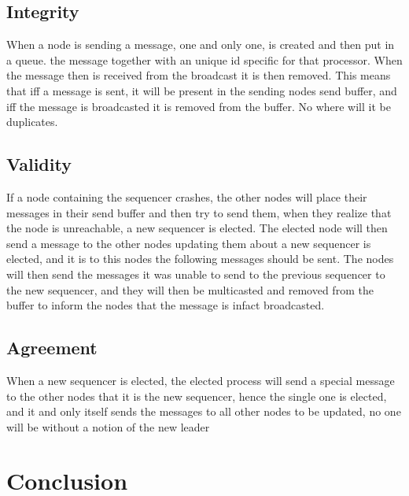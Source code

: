 \documentclass{article}
\begin{document}
  \subsection{Integrity}
    When a node is sending a message, one and only one, is created and then put in a queue.
    the message together with an unique id specific for that processor. When the message then is 
    received from the broadcast it is then removed. This means that iff a message is sent, it
    will be present in the sending nodes send buffer, and iff the message is broadcasted it is
    removed from the buffer. No where will it be duplicates.
  \subsection{Validity}
    If a node containing the sequencer crashes, the other nodes will place their messages in their
    send buffer and then try to send them, when they realize that the node is unreachable, a new 
    sequencer is elected. The elected node will then send a message to the other nodes updating them
    about a new sequencer is elected, and it is to this nodes the following messages should be sent.
    The nodes will then send the messages it was unable to send to the previous sequencer to the
    new sequencer, and they will then be multicasted and removed from the buffer to inform the nodes
    that the message is infact broadcasted.
  \subsection{Agreement}
    When a new sequencer is elected, the elected process will send a special message to the other nodes
    that it is the new sequencer, hence the single one is elected, and it and only itself sends the 
    messages to all other nodes to be updated, no one will be without a notion of the new leader
\section{Conclusion}
\end{document}
